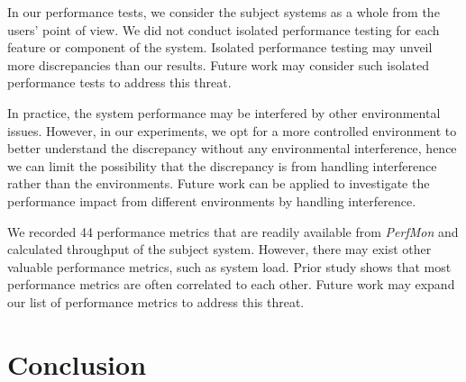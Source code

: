 \documentclass[smallextended]{svjour3}       %
\begin{document}
In our performance tests, we consider the subject systems as a whole from the users' point of view. We did not conduct isolated performance testing for each feature or component of the system. Isolated performance testing may unveil more discrepancies than our results. Future work may consider such isolated performance tests to address this threat.

In practice, the system performance may be interfered by other environmental issues. However, in our experiments, we opt for a more controlled environment to better understand the discrepancy without any environmental interference, hence we can limit the possibility that the discrepancy is from handling interference rather than the environments. Future work can be applied to investigate the performance impact from different environments by handling interference.

We recorded 44 performance metrics that are readily available from \emph{PerfMon} and calculated throughput of the subject system. However, there may exist other valuable performance metrics, such as system load. Prior study shows that most performance metrics are often correlated to each other\cite{Malik:2010:ACL:1955601.1955936}. Future work may expand our list of performance metrics to address this threat.



\section{Conclusion}
\label{sec:conclusion}
\end{document}
